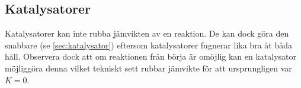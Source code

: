 \subsection{Katalysatorer}

Katalysatorer kan inte rubba jämvikten av en reaktion. De kan dock göra den snabbare (se \vref{sec:katalysator}) eftersom katalysatorer fugnerar lika bra åt båda håll. Observera dock att om reaktionen från börja är omöjlig kan en katalysator möjliggöra denna vilket tekniskt sett rubbar jämvikte för att ursprungligen var $K = 0$.
